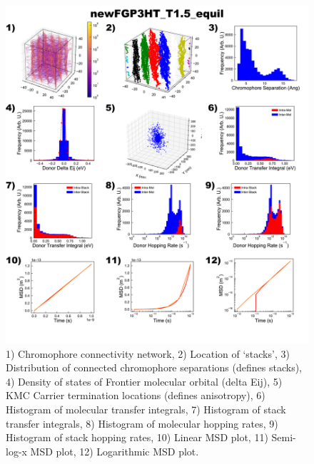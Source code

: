 \documentclass[12pt]{article}
\begin{document}
\begin{figure}[h]\centering
	\includegraphics[width=\textwidth]{Figures/newFGP3HT_T1.5_equil.png}
    \caption{   1) Chromophore connectivity network, 
                2) Location of `stacks', 
                3) Distribution of connected chromophore separations (defines stacks),
                4) Density of states of Frontier molecular orbital (delta Eij),
                5) KMC Carrier termination locations (defines anisotropy),
                6) Histogram of molecular transfer integrals,
                7) Histogram of stack transfer integrals,
                8) Histogram of molecular hopping rates,
                9) Histogram of stack hopping rates,
                10) Linear MSD plot,
                11) Semi-log-x MSD plot,
                12) Logarithmic MSD plot.}
	\label{fig:EqlT1.5}
\end{figure}
\end{document}
